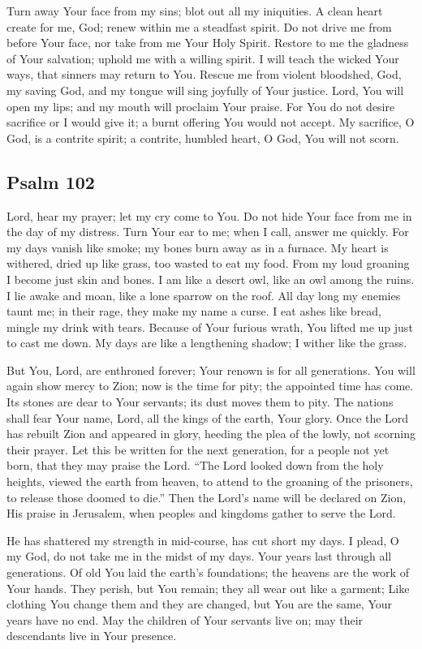 \documentclass[12pt]{article}
\newcommand{\prayertitle}[1]{\subsection{#1}}
\newcommand{\indulgencedprayertitle}[1]{\prayertitle{#1 \protect\kreuz}}
\begin{document}
Turn away Your face from my sins;
blot out all my iniquities.
A clean heart create for me, God;
renew within me a steadfast spirit.
Do not drive me from before Your face, nor take from me Your Holy Spirit.
Restore to me the gladness of Your salvation;
uphold me with a willing spirit.
I will teach the wicked Your ways, that sinners may return to You.
Rescue me from violent bloodshed, God, my saving God, and my tongue will sing joyfully of Your justice.
Lord, You will open my lips;
and my mouth will proclaim Your praise.
For You do not desire sacrifice or I would give it;
a burnt offering You would not accept.
My sacrifice, O God, is a contrite spirit;
a contrite, humbled heart, O God, You will not scorn.

\indulgencedprayertitle{Psalm 102}
Lord, hear my prayer;
let my cry come to You.
Do not hide Your face from me in the day of my distress.
Turn Your ear to me;
when I call, answer me quickly.
For my days vanish like smoke;
my bones burn away as in a furnace.
My heart is withered, dried up like grass, too wasted to eat my food.
From my loud groaning I become just skin and bones.
I am like a desert owl, like an owl among the ruins.
I lie awake and moan, like a lone sparrow on the roof.
All day long my enemies taunt me;
in their rage, they make my name a curse.
I eat ashes like bread, mingle my drink with tears.
Because of Your furious wrath, You lifted me up just to cast me down.
My days are like a lengthening shadow;
I wither like the grass.

But You, Lord, are enthroned forever;
Your renown is for all generations.
You will again show mercy to Zion;
now is the time for pity;
the appointed time has come.
Its stones are dear to Your servants;
its dust moves them to pity.
The nations shall fear Your name, Lord,
all the kings of the earth, Your glory.
Once the Lord has rebuilt Zion and appeared in glory, heeding the plea of the lowly, not scorning their prayer.
Let this be written for the next generation, for a people not yet born, that they may praise the Lord.
``The Lord looked down from the holy heights, viewed the earth from heaven, to attend to the groaning of the prisoners, to release those doomed to die.''
Then the Lord's name will be declared on Zion, His praise in Jerusalem, when peoples and kingdoms gather to serve the Lord.

He has shattered my strength in mid-course, has cut short my days.
I plead, O my God, do not take me in the midst of my days.
Your years last through all generations.
Of old You laid the earth’s foundations;
the heavens are the work of Your hands.
They perish, but You remain;
they all wear out like a garment;
Like clothing You change them and they are changed, but You are the same, Your years have no end.
May the children of Your servants live on;
may their descendants live in Your presence.
\end{document}
